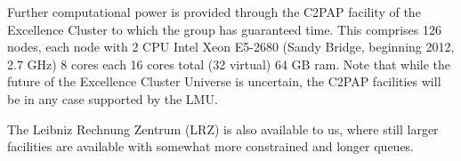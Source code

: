 \documentclass[10pt,fleqn,twoside]{article}
\begin{document}
Further computational power is provided through the C2PAP facility of the Excellence Cluster to which
the group has guaranteed time. This comprises 126 nodes, each node with 2 CPU Intel Xeon E5-2680 (Sandy
Bridge, beginning 2012, 2.7 GHz) 8 cores each 16 cores total (32
virtual) 64 GB ram. Note that while the future of the Excellence
Cluster Universe is uncertain, the C2PAP facilities will be in any
case supported by the LMU. 

The Leibniz Rechnung Zentrum (LRZ) is also available to us, where still
larger facilities are available with somewhat more constrained and longer queues.

% 
% 
% 

\newpage

\mbox{}
\end{document}
